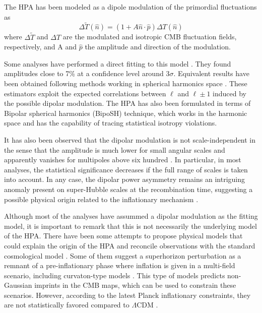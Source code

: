 The HPA has been modeled as a dipole modulation of the primordial fluctuations \cite{2005PhRvD..72j3002G, 2007ApJ...656..636G} as
%
\begin{equation}\label{DM}
    \Delta{\tilde{T}}(\hat{n}) = (1+A\hat{n}\cdot\hat{p})\Delta{T}(\hat{n})
\end{equation}
%
where $\Delta{\tilde{T}}$ and $\Delta{T}$ are the modulated and isotropic CMB fluctuation fields, respectively, and A and $\hat{p}$ the amplitude and direction of the modulation.

Some analyses have 
performed a direct fitting
to this model \cite{2009ApJ...699..985H, 2007ApJ...660L..81E, 2014A&A...571A..23P, 2017PhRvD..95f3011Z}. They found amplitudes close to 7\% 
at a confidence level
around 3$\sigma$. Equivalent results have been obtained following methods working in 
spherical harmonics space \cite{2015PhRvD..91b3515R, 2009PhRvD..80f3004H, 2016JCAP...01..046G, 2016A&A...594A..16P}. These estimators exploit the expected correlations between $\ell$ and $\ell\pm 1$ induced by the possible dipolar modulation. The HPA has also been formulated in terms of Bipolar spherical harmonics (BipoSH) \cite{2016A&A...594A..16P, 2023arXiv230104539D} technique, which works in the harmonic space and has the capability of tracing 
statistical isotropy violations.

It has also been observed that the dipolar modulation is not scale-independent in the sense that the amplitude is much lower for small angular scales and apparently vanishes for multipoles above six hundred \cite{2009ApJ...704.1448H, Akrami:2014eta, Marcos-Caballero:2019jqj}. In particular, in most analyses, the statistical significance decreases if the full range of scales is taken into account.
In any case, the dipolar power asymmetry remains an intriguing anomaly present on super-Hubble scales at the recombination time, suggesting a possible physical origin related to the inflationary mechanism \cite{2016JCAP...01..046G, 2016A&A...594A..16P}.

Although most of the analyses have assummed a dipolar modulation as the fitting model, it is important to remark that this is not necessarily the underlying model of the HPA. There have been some attempts to propose physical models that could explain the origin of the HPA and reconcile observations with the standard cosmological model \cite{2008PhRvD..78l3520E, 2009PhRvD..80b3526D, 2010PhRvD..81h3501C, 2011JHEP...02..061K, 2013JCAP...08..007L, 2016MNRAS.460.1577K, 2017PhRvD..95f3011Z, 2022arXiv220903928S}. Some of them suggest a superhorizon perturbation as a remnant of a pre-inflationary phase where inflation is given in a multi-field scenario, including curvaton-type models \cite{2008PhRvD..78l3520E}. This type of models predicts non-Gaussian imprints in the CMB maps, which can be used to constrain these scenarios. However, according to the latest Planck inflationary constraints, 
they are not statistically favored compared to $\Lambda$CDM \cite{2020A&A...641A..10P}.

